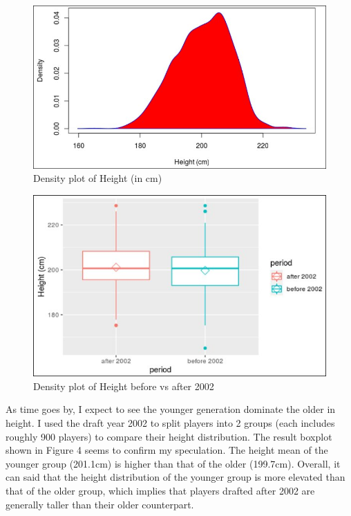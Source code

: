 \documentclass[a4paper,12pt,twoside]{article}
\numberwithin{equation}{section}
\begin{document}
\begin{figure}[h!]
\caption{Density plot of Height (in cm)}
\includegraphics[scale=0.3]{dsoh.jpg}
\centering
\end{figure}

\begin{figure}[h]
\caption{Density plot of Height before vs after 2002}
\includegraphics[scale=0.32]{hebf02.jpg}
\centering
\end{figure}

As time goes by, I expect to see the younger generation dominate the older in height. I used the draft year 2002 to split players into 2 groups (each includes roughly 900 players) to compare their height distribution. The result boxplot shown in Figure 4 seems to confirm my speculation. The height mean of the younger group (201.1cm) is higher than that of the older (199.7cm). Overall, it can said that the height distribution of the younger group is more elevated than that of the older group, which implies that players drafted after 2002 are generally taller than their older counterpart.
\end{document}
